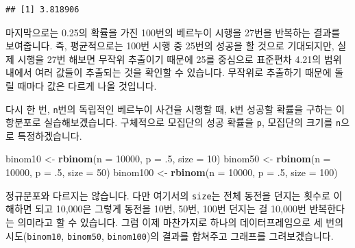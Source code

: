 \documentclass[]{book}
\newenvironment{Shaded}{\begin{snugshade}}{\end{snugshade}}
\newcommand{\DataTypeTok}[1]{\textcolor[rgb]{0.13,0.29,0.53}{#1}}
\newcommand{\DecValTok}[1]{\textcolor[rgb]{0.00,0.00,0.81}{#1}}
\newcommand{\FloatTok}[1]{\textcolor[rgb]{0.00,0.00,0.81}{#1}}
\newcommand{\KeywordTok}[1]{\textcolor[rgb]{0.13,0.29,0.53}{\textbf{#1}}}
\newcommand{\NormalTok}[1]{#1}
\newcommand{\StringTok}[1]{\textcolor[rgb]{0.31,0.60,0.02}{#1}}
\begin{document}
\begin{verbatim}
## [1] 3.818906
\end{verbatim}

마지막으로는 0.25의 확률을 가진 100번의 베르누이 시행을 27번을 반복하는 결과를 보여줍니다. 즉, 평균적으로는 100번 시행 중 25번의 성공을 할 것으로 기대되지만, 실제 시행을 27번 해보면 무작위 추출이기 때문에 25를 중심으로 표준편차 4.21의 범위 내에서 여러 값들이 추출되는 것을 확인할 수 있습니다. 무작위로 추출하기 때문에 돌릴 때마다 값은 다르게 나올 것입니다.

다시 한 번, \texttt{n}번의 독립적인 베르누이 사건을 시행할 때, \texttt{k}번 성공할 확률을 구하는 이항분포로 실습해보겠습니다. 구체적으로 모집단의 성공 확률을 \texttt{p}, 모집단의 크기를 \texttt{n}으로 특정하겠습니다.

\begin{Shaded}
\begin{Highlighting}[]
\NormalTok{binom10 <-}\StringTok{ }\KeywordTok{rbinom}\NormalTok{(}\DataTypeTok{n =} \DecValTok{10000}\NormalTok{, }\DataTypeTok{p =} \FloatTok{.5}\NormalTok{, }\DataTypeTok{size =} \DecValTok{10}\NormalTok{)}
\NormalTok{binom50 <-}\StringTok{ }\KeywordTok{rbinom}\NormalTok{(}\DataTypeTok{n =} \DecValTok{10000}\NormalTok{, }\DataTypeTok{p =} \FloatTok{.5}\NormalTok{, }\DataTypeTok{size =} \DecValTok{50}\NormalTok{)}
\NormalTok{binom100 <-}\StringTok{ }\KeywordTok{rbinom}\NormalTok{(}\DataTypeTok{n =} \DecValTok{10000}\NormalTok{, }\DataTypeTok{p =} \FloatTok{.5}\NormalTok{, }\DataTypeTok{size =} \DecValTok{100}\NormalTok{)}
\end{Highlighting}
\end{Shaded}

정규분포와 다르지는 않습니다. 다만 여기서의 \texttt{size}는 전체 동전을 던지는 횟수로 이해하면 되고 10,000은 그렇게 동전을 10번, 50번, 100번 던지는 걸 10,000번 반복한다는 의미라고 할 수 있습니다. 그럼 이제 마찬가지로 하나의 데이터프레임으로 세 번의 시도(\texttt{binom10}, \texttt{binom50}, \texttt{binom100})의 결과를 합쳐주고 그래프를 그려보겠습니다.
\end{document}
